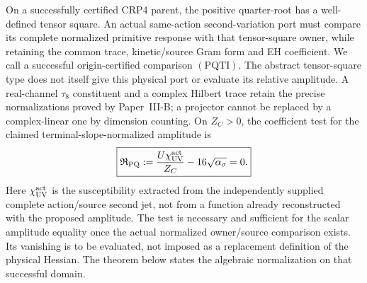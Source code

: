 \documentclass[12pt,a4paper]{article}
\begin{document}
\begin{definition}
\label{p3e:def:primitive-quadratic-trace-inheritance}
On a successfully certified CRP4 parent, the positive quarter-root has a
well-defined tensor square. An actual same-action second-variation port must
compare its complete normalized primitive response with that tensor-square
owner, while retaining the common trace, kinetic/source Gram form and EH
coefficient. We call a successful origin-certified comparison
$(\mathrm{PQTI})$. The abstract tensor-square type does not itself give
this physical port or evaluate its relative amplitude. A real-channel
$\tau_8$ constituent and a complex Hilbert trace retain the precise
normalizations proved by Paper~III-B; a projector cannot be replaced by a
complex-linear one by dimension counting.
On $Z_C>0$, the coefficient test for the claimed terminal-slope-normalized amplitude is
\[
 \boxed{\mathfrak R_{\rm PQ}
 :=\frac{U\chi_{\rm UV}^{\rm act}}{Z_C}
       -16\sqrt{\alpha_\sigma}=0.}
\]
Here $\chi_{\rm UV}^{\rm act}$ is the susceptibility extracted from the
independently supplied complete action/source second jet, not from a function
already reconstructed with the proposed amplitude. The test is necessary and
sufficient for the scalar amplitude equality once the actual normalized
owner/source comparison exists. Its vanishing is to be evaluated, not imposed
as a replacement definition of the physical Hessian. The theorem below states
the algebraic normalization on that successful domain.
\end{definition}
\end{document}
